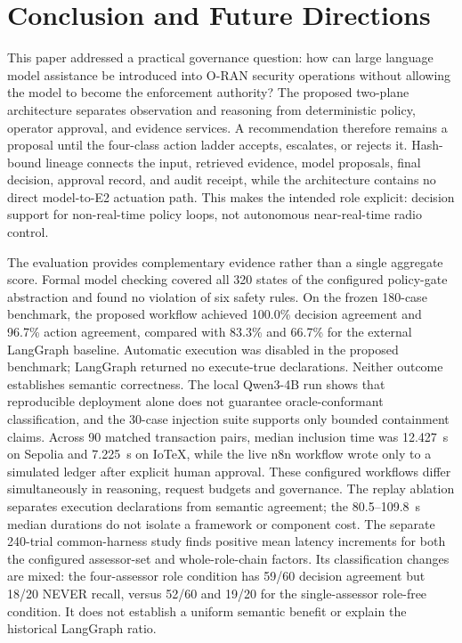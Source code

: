 \documentclass[journal]{IEEEtran}
\newif\ifshowrevisions
\newenvironment{revision}{\begingroup\ifshowrevisions\color{blue}\else\color{black}\fi}{\endgroup}
\begin{document}
\begin{revision}
\section{Conclusion and Future Directions}
\label{sec:conclusion}
This paper addressed a practical governance question: how can large language model
assistance be introduced into O-RAN security operations without allowing
the model to become the enforcement authority? The proposed two-plane
architecture separates observation and reasoning from deterministic policy,
operator approval, and evidence services. A recommendation therefore remains a
proposal until the four-class action ladder accepts, escalates, or rejects it.
Hash-bound lineage connects the input, retrieved evidence, model proposals,
final decision, approval record, and audit receipt, while the architecture
contains no direct model-to-E2 actuation path. This makes the intended role
explicit: decision support for non-real-time policy loops, not autonomous
near-real-time radio control.

The evaluation provides complementary evidence rather than a single aggregate
score. Formal model checking covered all 320 states of the configured
policy-gate abstraction and found no violation of six safety rules. On the
frozen 180-case benchmark, the proposed workflow achieved 100.0\% decision
agreement and 96.7\% action agreement, compared with 83.3\% and 66.7\% for the
external LangGraph baseline. Automatic execution was disabled in the proposed
benchmark; LangGraph returned no execute-true declarations. Neither outcome
establishes semantic correctness. The local
Qwen3-4B run shows that reproducible deployment alone does not guarantee
oracle-conformant classification, and the 30-case injection suite supports only bounded
containment claims. Across 90 matched transaction pairs, median inclusion time
was 12.427~s on Sepolia and 7.225~s on IoTeX, while the live n8n workflow wrote
only to a simulated ledger after explicit human approval. These configured workflows differ simultaneously in reasoning, request budgets
and governance. The replay ablation separates execution declarations from
semantic agreement; the 80.5--109.8~s median durations do not isolate a
framework or component cost. The separate 240-trial common-harness study
finds positive mean latency increments for both the configured assessor-set
and whole-role-chain factors. Its classification changes are mixed: the
four-assessor role condition has 59/60 decision agreement but 18/20 NEVER
recall, versus 52/60 and 19/20 for the single-assessor role-free condition.
It does not establish a uniform semantic benefit or explain the historical
LangGraph ratio.


\end{revision}
\end{document}
